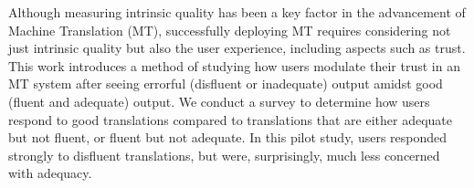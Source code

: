 Although measuring intrinsic quality has been a key factor in the advancement of Machine Translation (MT), successfully deploying MT requires considering not just intrinsic quality but also the user experience, including aspects such as trust. This work introduces a method of studying how users modulate their trust in an MT system after seeing errorful (disfluent or inadequate) output amidst good (fluent and adequate) output. We conduct a survey to determine how users respond to good translations compared to translations that are either adequate but not fluent, or fluent but not adequate. In this pilot study, users responded strongly to disfluent translations, but were, surprisingly, much less concerned with adequacy.
